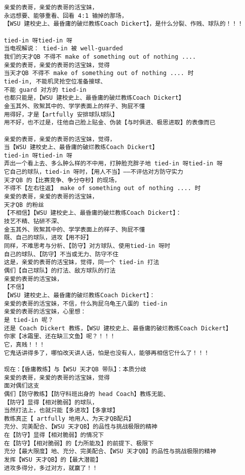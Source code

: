 \documentclass[9pt, b5paper]{article}
\begin{document}
\begin{verbatim}
亲爱的表哥，亲爱的表哥的活宝妹，
永远想要、能够重看、回看 4:1 输掉的那场，
【WSU 建校史上、最昏庸的破烂教练Coach Dickert】，是什么分裂、作贱、球队的！！！

tied-in 呀tied-in 呀
当电视解说： tied-in 被 well-guarded
我们的天才QB 不得不 make of something out of nothing ....
亲爱的表哥，亲爱的表哥的活宝妹，觉得
当天才QB 不得不 make of something out of nothing .... 时
tied-in, 不能机灵抢空位准备接球、
不能 guard 对方的 tied-in
也都只能是，【WSU 建校史上、最昏庸的破烂教练Coach Dickert】
金玉其外、败絮其中的、学学表面上的样子、狗屁不懂
用得好，才是【artfully 安排球队球队】
用不好，也不过是，往他自己脸上贴金、伪装【与时俱进、极思进取】的表像而已

亲爱的表哥，亲爱的表哥的活宝妹，觉得，
当【WSU 建校史上、最昏庸的破烂教练Coach Dickert】
tied-in 呀tied-in 呀
弄出一个看上去、多么肿么样的不中用，打肿脸充胖子地 tied-in 呀tied-in 呀
它自己的球队，tied-in 呀时，【用人不当】——不评估对方防守实力
天才QB 的【比赛竞争、争分夺秒】的现场，
不得不【左右往返】 make of something out of nothing .... 时
亲爱的表哥，亲爱的表哥的活宝妹，
天才QB 的粉丝
【不相信】【WSU 建校史上、最昏庸的破烂教练Coach Dickert】：
技艺不精、钻研不深、
金玉其外、败絮其中的、学学表面上的样子、狗屁不懂
既、自己的球队，进攻【用不好】
同样，不难思考与分析、【防守】对方球队、使用tied-in 呀时
自己的球队、【防守】不当或无力、防守不住
这是，亲爱的表哥的活宝妹，觉得，同一个 tied-in 打法
偶们【自己球队】的打法、敌方球队的打法
亲爱的表哥的活宝妹，
【不信】
【WSU 建校史上、最昏庸的破烂教练Coach Dickert】：
亲爱的表哥的活宝妹，不信，什么狗屁乌龟王八蛋的 tied-in
亲爱的表哥的活宝妹，心里想：
是 tied-in 呢？
还是 Coach Dickert 教练，【WSU 建校史上、最昏庸的破烂教练Coach Dickert】
你家【冰霜里、还在缺三文鱼】呢？！！！
它，真贱！！！
它鬼话讲得多了，哪怕改天讲人话，怕是也没有人，能够再相信它什么了！！！

现在：【昏庸教练】与【WSU 天才QB 带队】：本质分歧
亲爱的表哥，亲爱的表哥的活宝妹，觉得
面对偶们这支
偶们【防守教练】【防守科班出身的 head Coach】教练无能、
【防守】显得【相对脆弱】的球队，
当然打法上，也就只能【多进攻】【多拿球】
教练真正【 artfully 地用人、为天才QB配兵】
充分、完美配合、【WSU 天才QB】的品性与挑战极限的精神
在【防守】显得【相对脆弱】的情况下
在【防守】【相对脆弱】的【力所能及】的前提下、极限下
充分【最大限度】地、充分、完美配合、【WSU 天才QB】的品性与挑战极限的精神
发挥【WSU 天才QB】的【最大潜能】
进攻多得分，多过对方，就赢了！！


\end{verbatim}
\end{document}
